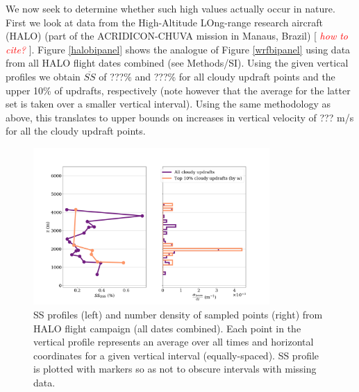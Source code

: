 \documentclass{article}
\newcommand{\klcomm}[1]{\textcolor{red}{\textit{#1}}}
\begin{document}
We now seek to determine whether such high values actually occur in nature. First we look at data from the High-Altitude LOng-range research aircraft (HALO) (part of the ACRIDICON-CHUVA mission in Manaus, Brazil) [ \klcomm{how to cite?} ]. Figure \ref{halobipanel} shows the analogue of Figure \ref{wrfbipanel} using data from all HALO flight dates combined (see Methods/SI). Using the given vertical profiles we obtain $\overline{SS}$ of ???\% and ???\% for all cloudy updraft points and the upper 10\% of updrafts, respectively (note however that the average for the latter set is taken over a smaller vertical interval). Using the same methodology as above, this translates to upper bounds on increases in vertical velocity of ??? m/s for all the cloudy updraft points. 



\begin{figure}[ht]
    \centering
    \includegraphics[width=9cm]{revhalo/v1_FINAL_combined_bipanel_ss_qss_vs_z_figure.png}
    \caption{SS profiles (left) and number density of sampled points (right) from HALO flight campaign (all dates combined). Each point in the vertical profile represents an average over all times and horizontal coordinates for a given vertical interval (equally-spaced). SS profile is plotted with markers so as not to obscure intervals with missing data.}
    \label{haloqsshist}
\end{figure}
\end{document}
